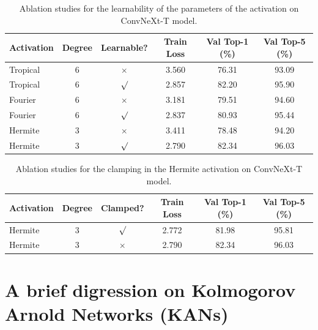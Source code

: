 \documentclass{article} %
\theoremstyle{plain}
\theoremstyle{definition}
\theoremstyle{remark}
\begin{document}
\begin{table}[!htbp]
\caption{Ablation studies for the learnability of the parameters of the activation on ConvNeXt-T model.}
\label{res:ablation_learnable}
\begin{center}
\begin{small}
\begin{tabular}{lccccc}
\toprule
\textbf{Activation} & \textbf{Degree} & \textbf{Learnable?}  & \textbf{Train Loss} & \textbf{Val Top-1 (\%)} & \textbf{Val Top-5 (\%)}\\
\midrule
Tropical & 6 & $\times$ & 3.560 & 76.31 & 93.09 \\
Tropical & 6 & $\surd$ & 2.857 & 82.20 & 95.90 \\
\midrule
Fourier & 6 & $\times$ & 3.181 & 79.51 & 94.60 \\
Fourier & 6 & $\surd$ & 2.837 & 80.93 & 95.44 \\
\midrule
Hermite & 3 & $\times$ & 3.411 & 78.48 & 94.20 \\
Hermite & 3 & $\surd$ & 2.790 & 82.34 & 96.03 \\

\bottomrule
\end{tabular}
\end{small}
\end{center}
\end{table}
\begin{table}[!htbp]
\caption{Ablation studies for the clamping in the Hermite activation on ConvNeXt-T model.}
\label{res:ablation_clamp}
\begin{center}
\begin{small}
\begin{tabular}{lccccc}
\toprule
\textbf{Activation} & \textbf{Degree} & \textbf{Clamped?}  & \textbf{Train Loss} & \textbf{Val Top-1 (\%)} & \textbf{Val Top-5 (\%)}\\
\midrule
Hermite & 3 & $\surd$ & 2.772 & 81.98 & 95.81 \\
Hermite & 3 & $\times$ & 2.790 & 82.34 & 96.03 \\
\bottomrule
\end{tabular}
\end{small}
\end{center}
\end{table}

\section{A brief digression on Kolmogorov Arnold Networks (KANs)}
\label{appendix:kan}
\end{document}
